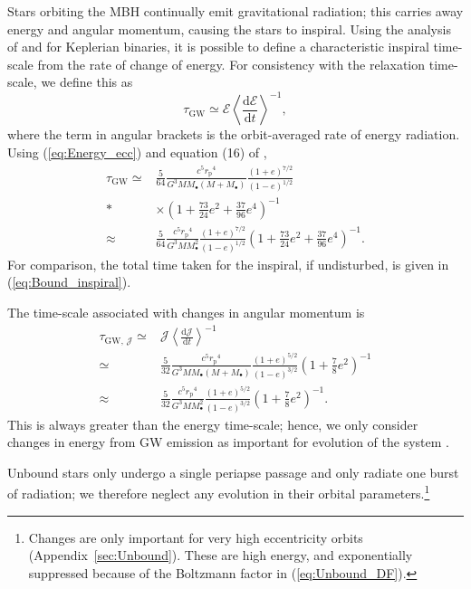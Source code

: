 \documentclass[useAMS,usedcolumn,usegraphicx,usenatbib]{mn2e}
\newcommand{\eqnref}[1]{(\ref{eq:#1})}
\newcommand{\apref}[1]{Appendix~\ref{sec:#1}}
\newcommand{\sub}[1]{\ensuremath{_\mathrm{#1}}}
\newcommand{\dd}{\ensuremath{\mathrm{d}}}
\newcommand{\diff}[2]{\ensuremath{\frac{\dd {#1}}{\dd {#2}}}}
\begin{document}
Stars orbiting the MBH continually emit gravitational radiation; this carries away energy and angular momentum, causing the stars to inspiral. Using the analysis of \citet{Peters1963} and \citet{Peters1964} for Keplerian binaries, it is possible to define a characteristic inspiral time-scale from the rate of change of energy. For consistency with the relaxation time-scale, we define this as \citep{MiraldaEscude2000, Merritt2011}
\begin{equation}
\tau\sub{GW} \simeq \mathcal{E}\left\langle\diff{\mathcal{E}}{t}\right\rangle^{-1},
\label{eq:tGW-def}
\end{equation}
where the term in angular brackets is the orbit-averaged rate of energy radiation. Using \eqnref{Energy_ecc} and equation (16) of \citet{Peters1963},
\begin{align}
\tau\sub{GW} \simeq {} & \frac{5}{64}\frac{c^5r\sub{p}^4}{G^3MM_\bullet\left(M + M_\bullet\right)}\frac{(1+e)^{7/2}}{(1-e)^{1/2}} \nonumber \\*
 {} & \times {} \left(1+\frac{73}{24}e^2 + \frac{37}{96}e^4\right)^{-1} \\
 \approx {} & \frac{5}{64}\frac{c^5r\sub{p}^4}{G^3MM_\bullet^2}\frac{(1+e)^{7/2}}{(1-e)^{1/2}}\left(1+\frac{73}{24}e^2 + \frac{37}{96}e^4\right)^{-1}.
\end{align}
For comparison, the total time taken for the inspiral, if undisturbed, is given in \eqnref{Bound_inspiral}.

The time-scale associated with changes in angular momentum is \citep{Peters1964}
\begin{align}
\tau_{\mathrm{GW},\, \mathcal{J}} \simeq {} & \mathcal{J}\left\langle\diff{\mathcal{J}}{t}\right\rangle^{-1} \\
 \simeq {} & \frac{5}{32}\frac{c^5r\sub{p}^4}{G^3MM_\bullet\left(M + M_\bullet\right)}\frac{(1+e)^{5/2}}{(1-e)^{3/2}}\left(1+\frac{7}{8}e^2\right)^{-1} \\
 \approx {} & \frac{5}{32}\frac{c^5r\sub{p}^4}{G^3MM_\bullet^2}\frac{(1+e)^{5/2}}{(1-e)^{3/2}}\left(1+\frac{7}{8}e^2\right)^{-1}.
\end{align}
This is always greater than the energy time-scale; hence, we only consider changes in energy from GW emission as important for evolution of the system \citep{Hopman2005}.

Unbound stars only undergo a single periapse passage and only radiate one burst of radiation; we therefore neglect any evolution in their orbital parameters.\footnote{Changes are only important for very high eccentricity orbits (\apref{Unbound}). These are high energy, and exponentially suppressed because of the Boltzmann factor in \eqnref{Unbound_DF}.}
\end{document}
